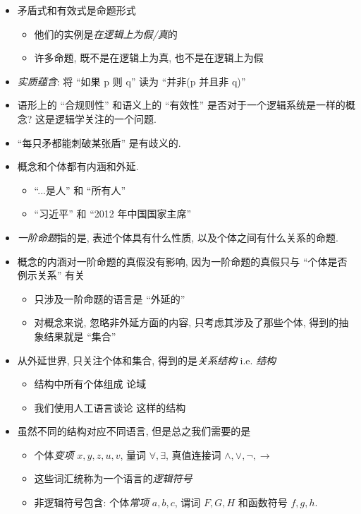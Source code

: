 \documentclass[a4paper]{article}
\begin{document}
\begin{itemize}
\item 矛盾式和有效式是命题形式 \begin{itemize}
  \item 他们的实例是\emph{在逻辑上为假/真}的
  \item 许多命题, 既不是在逻辑上为真, 也不是在逻辑上为假
  \end{itemize}

\item \emph{实质蕴含}: 将 ``如果 p 则 q'' 读为 ``并非(p 并且非 q)''

\item 语形上的 ``合规则性'' 和语义上的 ``有效性'' 是否对于一个逻辑系统是一样的概念? 这是逻辑学关注的一个问题.

\item ``每只矛都能刺破某张盾'' 是有歧义的.

\item 概念和个体都有内涵和外延. \begin{itemize}
  \item ``...是人'' 和 ``所有人''
  \item ``习近平'' 和 ``2012 年中国国家主席''
  \end{itemize}

\item \emph{一阶命题}指的是, 表述个体具有什么性质, 以及个体之间有什么关系的命题.

\item 概念的内涵对一阶命题的真假没有影响, 因为一阶命题的真假只与 ``个体是否例示关系'' 有关 \begin{itemize}
  \item 只涉及一阶命题的语言是 ``外延的''
  \item 对概念来说, 忽略非外延方面的内容, 只考虑其涉及了那些个体, 得到的抽象结果就是 ``集合''
  \end{itemize}

\item 从外延世界, 只关注个体和集合, 得到的是\emph{关系结构} i.e. \emph{结构} \begin{itemize}
  \item 结构中所有个体组成 论域
  \item 我们使用人工语言谈论 这样的结构
  \end{itemize}

\item 虽然不同的结构对应不同语言, 但是总之我们需要的是 \begin{itemize}
  \item 个体\emph{变项} $x, y, z, u, v$, 量词 $\forall, \exists$, 真值连接词 $\land, \lor, \lnot, \to$
  \item 这些词汇统称为一个语言的\emph{逻辑符号}
  \item 非逻辑符号包含: 个体\emph{常项} $a, b, c$, 谓词 $F, G, H$ 和函数符号 $f, g, h$.
  \end{itemize}


\end{itemize}
\end{document}
